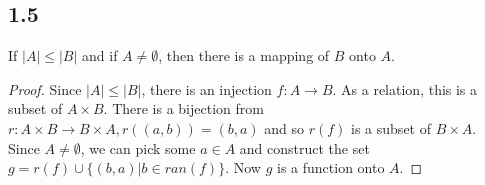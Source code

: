 \subsection*{1.5} If $|A| \leq |B|$ and if $A \neq \emptyset$, then there is a mapping of $B$ onto $A$.

\begin{proof}
Since $|A| \leq |B|$, there is an injection $f: A \rightarrow B$. As a relation, this is a subset of $A \times B$. There is a bijection from $r: A \times B \rightarrow B \times A, r((a,b)) = (b,a)$ and so $r(f)$ is a subset of $B \times A$. Since $A \neq \emptyset$, we can pick some $a \in A$ and construct the set $g = r(f) \cup \{(b,a) | b \in ran(f)\}$. Now $g$ is a function onto $A$.
\end{proof}

